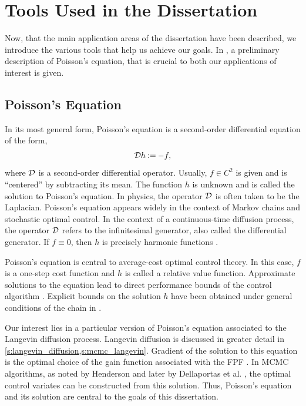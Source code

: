 \section{Tools Used in the Dissertation}
\label{s:tools}
Now, that the main application areas of the dissertation have been described, we introduce the various tools that help us achieve our goals. In , a preliminary description of Poisson's equation, that is crucial to both our applications of interest is given.
\subsection{Poisson's Equation} 
\label{s:poissons}
In its most general form, Poisson's equation is a second-order differential equation of the form,
\begin{equation*}
{\cal D} h \mathbin{:=} - f,
\end{equation*}
where ${\cal D}$ is a second-order differential operator. Usually, $f \in C^2$ is given and is ``centered'' by subtracting its mean. The function $h$ is unknown and is called the solution to Poisson's equation. In physics, the operator ${\cal D}$ is often taken to be the Laplacian. Poisson's equation appears widely in the context of Markov chains and stochastic optimal control. In the context of a continuous-time diffusion process, the operator ${\cal D}$ refers to the infinitesimal generator, also called the differential generator. If $f \equiv 0$, then $h$ is precisely harmonic functions \cite{glymey96a}.

Poisson's equation is central to average-cost optimal control theory. In this case, $f$ is a one-step cost function and $h$ is called a relative value function. Approximate solutions to the equation lead to direct performance bounds of the control algorithm \cite{ctcn}. Explicit bounds on the solution $h$ have been obtained under general conditions of the chain in \cite{devkonmey17b}. 

Our interest lies in a particular version of Poisson's equation associated to the Langevin diffusion process. Langevin diffusion is discussed in greater detail in \cref{s:langevin_diffusion,s:mcmc_langevin}. Gradient of the solution to this equation is the optimal choice of the gain function associated with the FPF \cite{yanmehmey13}. In MCMC algorithms, as noted by Henderson \cite{henthesis97} and later by Dellaportas et al. \cite{delkon12}, the optimal control variates can be constructed from this solution. Thus, Poisson's equation and its solution are central to the goals of this dissertation. 
 
